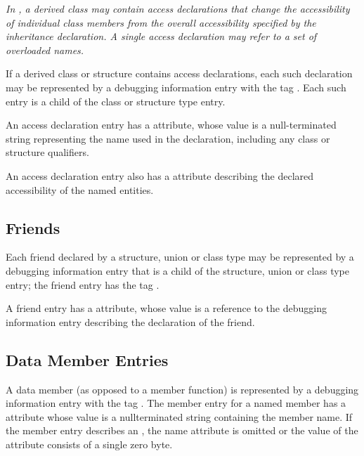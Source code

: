 \textit{In , a derived class may contain access declarations that
change the accessibility of individual class members from the
overall accessibility specified by the inheritance declaration.
A single access declaration may refer to a set of overloaded
names.}

If a derived class or structure contains access declarations,
each such declaration may be represented by a debugging
information entry with the tag \DWTAGaccessdeclarationTARG.
Each such entry is a child of the class or structure type entry.

An access declaration entry has a \DWATname{} attribute, 
whose value is a null-terminated string representing the name 
used in the declaration,
\bbeb
including any class or structure qualifiers.

An\hypertarget{chap:DWATaccessdeclaration}{} 
access declaration entry also has a
\bb 
\hyperlink{chap:DWATaccessibilityattribute}{\DWATaccessibilityNAME}
\eb
{}
attribute describing the declared accessibility of the named entities.


\subsection{Friends}
\label{chap:friends}

Each\hypertarget{chap:DWATfriendfriendrelationship}{} 
friend
declared by a structure, union or class
type may be represented by a debugging information entry
that is a child of the structure, union or class type entry;
the friend entry has the tag \DWTAGfriendTARG.

A friend entry has a \DWATfriendDEFN{} attribute,
 whose value is
a reference to the debugging information entry describing
the declaration of the friend.


\subsection{Data Member Entries}
\label{chap:datamemberentries}

A data member (as opposed to a member function) is
represented by a debugging information entry with the 
tag \DWTAGmemberTARG. 
The 
member entry for a named member has
a \DWATname{} attribute 
whose value is a null\dash terminated
string containing the member name.
\bbeb
If the member entry describes an 
,
the name attribute is omitted or the value of the attribute
consists of a single zero byte.

